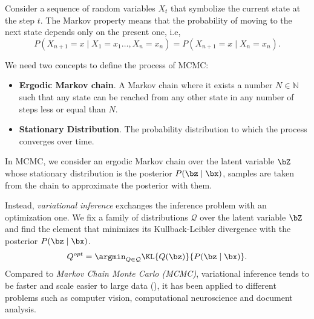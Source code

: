 \begin{center}
\end{center}

Consider a sequence of random variables \(X_{t}\) that symbolize the current state at the step \(t\). The Markov property means that the probability of moving to the next state depends only on the present one, i.e,
\[
  P(X_{n+1} = x \mid X_{1} = x_{1} \dots, X_{n} = x_{n}) = P(X_{n+1} = x \mid X_{n} = x_{n}).
\]

We need two concepts to define the process of MCMC:
\begin{itemize}
  \item \textbf{Ergodic Markov chain}. A Markov chain where it exists a number \(N \in \mathbb{N}\) such that any state can be reached from any other state in any number of steps less or equal than \(N\).
  \item \textbf{Stationary Distribution}. The probability distribution to which the process converges over time. 
\end{itemize}

In MCMC, we consider an ergodic Markov chain over the latent variable \(\bZ\) whose stationary distribution is the posterior \(P(\bz \mid \bx)\), samples are taken from the chain to approximate the posterior with them.

Instead, \emph{variational inference} exchanges the inference problem with an optimization one. We fix a family of distributions \(\mathcal{Q}\) over the latent variable \(\bZ\) and find the element that minimizes its Kullback-Leibler divergence with the posterior \(P(\bz \mid \bx)\).
\[
  Q^{opt} = \argmin_{Q \in \mathcal{Q}} \KL{Q(\bz)}{P(\bz \mid \bx)}.
\]
Compared to \emph{Markov Chain Monte Carlo (MCMC)}, variational inference tends to be faster and scale easier to large data (\cite{blei2017variational}), it has been applied to different problems such as computer vision, computational neuroscience and document analysis.

